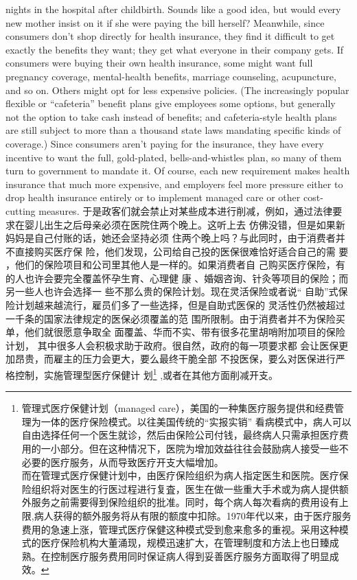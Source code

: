\begin{paracol}{2}
nights in the hospital after childbirth. Sounds like a good idea,
but would every new mother insist on it if she were paying the bill herself? Meanwhile, since consumers don't shop directly for
health insurance, they find it difficult to get exactly the benefits
they want; they get what everyone in their company gets. If
consumers were buying their own health insurance, some
might want full pregnancy coverage, mental-health benefits,
marriage counseling, acupuncture, and so on. Others might opt
for less expensive policies. (The increasingly popular flexible or
``cafeteria'' benefit plans give employees some options, but generally not the option to take cash instead of benefits; and cafeteria-style health plans are still subject to more than a thousand
state laws mandating specific kinds of coverage.) Since consumers aren't paying for the insurance, they have every incentive to want the full, gold-plated, bells-and-whistles plan, so
many of them turn to government to mandate it. Of course,
each new requirement makes health insurance that much more
expensive, and employers feel more pressure either to drop
health insurance entirely or to implement managed care or
other cost-cutting measures.
\switchcolumn
于是政客们就会禁止对某些成本进行削减，例如，通过法律要求在婴儿出生之后母亲必须在医院住两个晚上。这听上去
仿佛没错，但是如果新妈妈是自己付账的话，她还会坚持必须
住两个晚上吗？与此同时，由于消费者并不直接购买医疗保
险，他们发现，公司给自己投的医保很难恰好适合自己的需
要 ，他们的保险项目和公司里其他人是一样的。如果消费者自
己购买医疗保险，有的人也许会要完全覆盖怀孕生育、心理健
康 、婚姻咨询、针灸等项目的保险；而另一些人也许会选择一
些不那么贵的保险计划。现在灵活保险或者说“ 自助”式保
险计划越来越流行，雇员们多了一些选择，但是自助式医保的
灵活性仍然被超过一千条的国家法律规定的医保必须覆盖的范
围所限制。由于消费者并不为保险买单，他们就很愿意争取全
面覆盖、华而不实、带有很多花里胡哨附加项目的保险计划，
其中很多人会积极求助于政府。很自然，政府的每一项要求都
会让医保更加昂贵，而雇主的压力会更大，要么最终干脆全部
不投医保，要么对医保进行严格控制，实施管理型医疗保健计
划\footnote{管理式医疗保健计划（managed care），美国的一种集医疗服务提供和经费管理为一体的医疗保险模式。以往美国传统的“实报实销” 看病模式中，病人可以自由选择任何一个医生就诊，然后由保险公司付钱，最终病人只需承担医疗费用的一小部分。但在这种情况下，医院为增加效益往往会鼓励病人接受一些不必要的医疗服务，从而导致医疗开支大幅增加。\\而在管理式医疗保健计划中，由医疗保险组织为病人指定医生和医院。医疗保险组织将对医生的行医过程进行复査，医生在做一些重大手术或为病人提供额外服务之前需要得到保险组织的批准。同时，每个病人每次看病的费用设有上限,病人获得的额外服务将从有限的额度中扣除。1970年代以来，由于医疗服务费用的急速上涨，管理式医疗保健这种模式受到愈来愈多的重视。采用这种模式的医疗保险机构大董涌现，规模迅速扩大，在管理制度和方法上也日臻成熟。在控制医疗服务费用同时保证病人得到妥善医疗服务方面取得了明显成效。} ,或者在其他方面削减开支。

\end{paracol}
